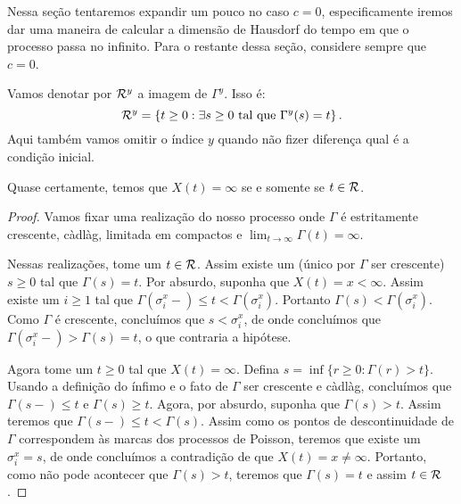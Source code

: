Nessa seção tentaremos expandir um pouco no caso $c = 0$,
especificamente iremos dar uma maneira de calcular a dimensão de
Hausdorf do tempo em que o processo passa no infinito.  Para o
restante dessa seção, considere sempre que $c = 0$.

\begin{definicao}
  Vamos denotar por ${\mathcal{R}}^y$ a imagem de $\Gamma^y$. Isso é:
  \begin{displaymath}
    {\mathcal{R}}^y = \left\{
      t \geq 0 : \exists s \geq 0 \textrm{ tal que } \Gamma^y(s) = t
    \right\}.
  \end{displaymath}
  Aqui também vamos omitir o índice $y$ quando não fizer diferença
  qual é a condição inicial.
\end{definicao}

\begin{proposicao}
  Quase certamente, temos que $X(t) = \infty$ se e somente se $t \in {\mathcal{R}}$.
\end{proposicao}
\begin{proof}
  Vamos fixar uma realização do nosso processo onde $\Gamma$ é
  estritamente crescente, càdlàg, limitada em compactos e $\lim_{t \to
    \infty} \Gamma(t) = \infty$.

  Nessas realizações, tome um $t \in {\mathcal{R}}$. Assim existe um (único por
  $\Gamma$ ser crescente) $s \geq 0$ tal que $\Gamma(s) = t$. Por
  absurdo, suponha que $X(t) = x < \infty$. Assim existe um $i \geq 1$
  tal que $\Gamma(\sigma_i^x -) \leq t < \Gamma(\sigma_i^x)$. Portanto
  $\Gamma(s) < \Gamma(\sigma_i^x)$. Como $\Gamma$ é crescente,
  concluímos que $s < \sigma_i^x$, de onde concluímos que
  $\Gamma(\sigma_i^x-) > \Gamma(s) = t$, o que contraria a hipótese.

  Agora tome um $t \geq 0$ tal que $X(t) = \infty$. Defina $s = \inf
  \{ r \geq 0 :  \Gamma(r) > t \}$. Usando a definição do ínfimo e o
  fato de $\Gamma$ ser crescente e càdlàg, concluímos que $\Gamma(s-)
  \leq t$ e $\Gamma(s) \geq t$. Agora, por absurdo, suponha que
  $\Gamma(s) > t$. Assim teremos que $\Gamma(s-) \leq t <
  \Gamma(s)$. Assim como os pontos de descontinuidade de $\Gamma$
  correspondem às marcas dos processos de Poisson, teremos que existe
  um $\sigma_i^x = s$, de onde concluímos a contradição de que $X(t) =
  x \neq \infty$. Portanto, como não pode acontecer que $\Gamma(s) >
  t$, teremos que $\Gamma(s) = t$ e assim $t \in {\mathcal{R}}$.
\end{proof}

